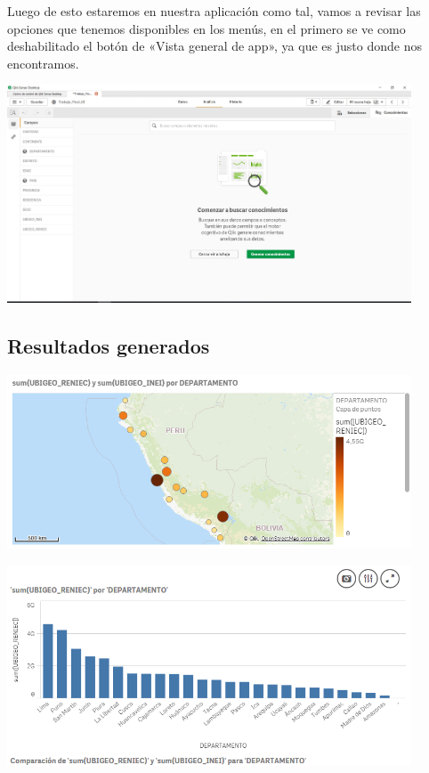 Luego de esto estaremos en nuestra aplicación como tal, vamos a revisar las opciones que tenemos disponibles en los menús, en el primero se ve como deshabilitado el botón de «Vista general de app», ya que es justo donde nos encontramos.
\begin{center}
	\includegraphics[width=12cm]{./Imagenes/img14} 
\end{center}

\subsection{Resultados generados}


\begin{center}
	\includegraphics[width=12cm]{./Imagenes/imgDesarrollo_1} 
\end{center}

\begin{center}
	\includegraphics[width=12cm]{./Imagenes/imgDesarrollo_2} 
\end{center}

